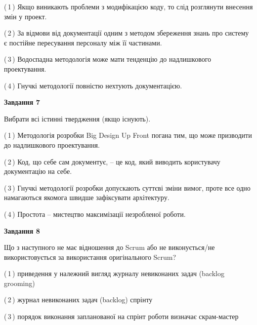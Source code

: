 \documentclass[10pt, ukrainian]{article}
\begin{document}
{\begin {large}
(\,1\,) Якщо виникають проблеми з модифікацією коду, то слід розглянути внесення змін у проект. %



(\,2\,) За відмови від документації одним з методом збереження знань про систему є постійне пересування персоналу між її частинами. %



(\,3\,) Водоспадна методологія може мати тенденцію до надлишкового проектування. %



(\,4\,) Гнучкі методології повністю нехтують документацією. %


{\begin {center}\textbf{Завдання 7}\end {center}}\par
Вибрати всі істинні твердження (якщо існують).\par
\vspace{2mm}



(\,1\,) Методологія розробки Big Design Up Front погана тим, що може призводити до надлишкового проектування. %



(\,2\,) Код, що себе сам документує, -- це код, який виводить користувачу документацію на себе. %



(\,3\,) Гнучкі методології розробки допускають суттєві зміни вимог, проте все одно намагаються якомога швидше зафіксувати архітектуру. %



(\,4\,) Простота – мистецтво максимізації незробленої роботи. %


{\begin {center}\textbf{Завдання 8}\end {center}}\par
Що з наступного не має відношення до Scrum або не виконується/не використовується за використання оригінального Scrum?\par
\vspace{2mm}



(\,1\,) приведення у належний вигляд журналу невиконаних задач (backlog grooming) %



(\,2\,) журнал невиконаних задач (backlog) спрінту%



(\,3\,) порядок виконання запланованої на спрінт роботи визначає скрам-мастер%




\end{large}}
\end{document}
